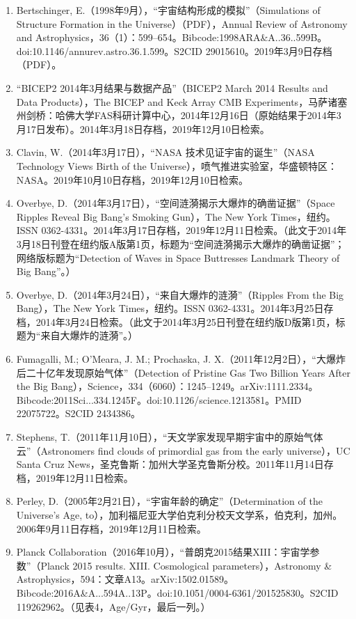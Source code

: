 \begin{enumerate}
\item Bertschinger, E.（1998年9月），“宇宙结构形成的模拟”（Simulations of Structure Formation in the Universe）（PDF），Annual Review of Astronomy and Astrophysics，36（1）：599–654。Bibcode:1998ARA&A..36..599B。doi:10.1146/annurev.astro.36.1.599。S2CID 29015610。2019年3月9日存档（PDF）。  
\item “BICEP2 2014年3月结果与数据产品”（BICEP2 March 2014 Results and Data Products），The BICEP and Keck Array CMB Experiments，马萨诸塞州剑桥：哈佛大学FAS科研计算中心，2014年12月16日（原始结果于2014年3月17日发布）。2014年3月18日存档，2019年12月10日检索。  
\item Clavin, W.（2014年3月17日），“NASA 技术见证宇宙的诞生”（NASA Technology Views Birth of the Universe），喷气推进实验室，华盛顿特区：NASA。2019年10月10日存档，2019年12月10日检索。  
\item Overbye, D.（2014年3月17日），“空间涟漪揭示大爆炸的确凿证据”（Space Ripples Reveal Big Bang’s Smoking Gun），The New York Times，纽约。ISSN 0362-4331。2014年3月17日存档，2019年12月11日检索。（此文于2014年3月18日刊登在纽约版A版第1页，标题为“空间涟漪揭示大爆炸的确凿证据”；网络版标题为“Detection of Waves in Space Buttresses Landmark Theory of Big Bang”。）  
\item Overbye, D.（2014年3月24日），“来自大爆炸的涟漪”（Ripples From the Big Bang），The New York Times，纽约。ISSN 0362-4331。2014年3月25日存档，2014年3月24日检索。（此文于2014年3月25日刊登在纽约版D版第1页，标题为“来自大爆炸的涟漪”。）  
\item Fumagalli, M.; O’Meara, J. M.; Prochaska, J. X.（2011年12月2日），“大爆炸后二十亿年发现原始气体”（Detection of Pristine Gas Two Billion Years After the Big Bang），Science，334（6060）：1245–1249。arXiv:1111.2334。Bibcode:2011Sci...334.1245F。doi:10.1126/science.1213581。PMID 22075722。S2CID 2434386。  
\item Stephens, T.（2011年11月10日），“天文学家发现早期宇宙中的原始气体云”（Astronomers find clouds of primordial gas from the early universe），UC Santa Cruz News，圣克鲁斯：加州大学圣克鲁斯分校。2011年11月14日存档，2019年12月11日检索。  
\item Perley, D.（2005年2月21日），“宇宙年龄的确定”（Determination of the Universe’s Age, to），加利福尼亚大学伯克利分校天文学系，伯克利，加州。2006年9月11日存档，2019年12月11日检索。  
\item Planck Collaboration（2016年10月），“普朗克2015结果XIII：宇宙学参数”（Planck 2015 results. XIII. Cosmological parameters），Astronomy & Astrophysics，594：文章A13。arXiv:1502.01589。Bibcode:2016A&A...594A..13P。doi:10.1051/0004-6361/201525830。S2CID 119262962。（见表4，Age/Gyr，最后一列。）

\end{enumerate}
